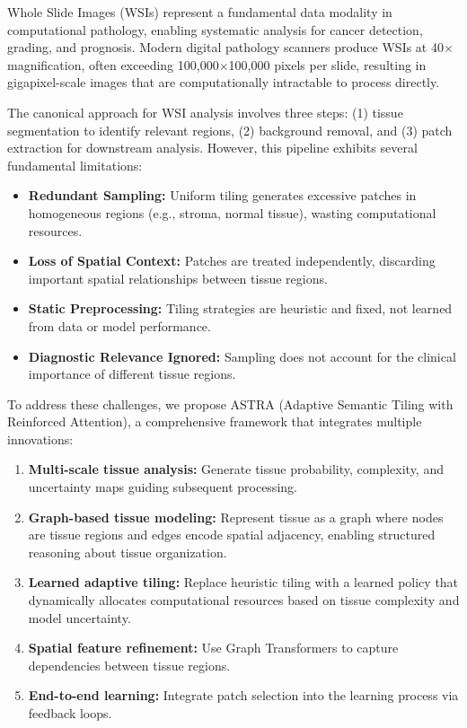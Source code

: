 \documentclass[runningheads]{llncs}
\begin{document}
\label{sec:intro}

Whole Slide Images (WSIs) represent a fundamental data modality in computational pathology, enabling systematic analysis for cancer detection, grading, and prognosis. Modern digital pathology scanners produce WSIs at 40$\times$ magnification, often exceeding 100,000$\times$100,000 pixels per slide, resulting in gigapixel-scale images that are computationally intractable to process directly.

The canonical approach for WSI analysis involves three steps: (1) tissue segmentation to identify relevant regions, (2) background removal, and (3) patch extraction for downstream analysis. However, this pipeline exhibits several fundamental limitations:

\begin{itemize}
\item \textbf{Redundant Sampling:} Uniform tiling generates excessive patches in homogeneous regions (e.g., stroma, normal tissue), wasting computational resources.

\item \textbf{Loss of Spatial Context:} Patches are treated independently, discarding important spatial relationships between tissue regions.

\item \textbf{Static Preprocessing:} Tiling strategies are heuristic and fixed, not learned from data or model performance.

\item \textbf{Diagnostic Relevance Ignored:} Sampling does not account for the clinical importance of different tissue regions.
\end{itemize}

To address these challenges, we propose ASTRA (Adaptive Semantic Tiling with Reinforced Attention), a comprehensive framework that integrates multiple innovations:

\begin{enumerate}
\item \textbf{Multi-scale tissue analysis:} Generate tissue probability, complexity, and uncertainty maps guiding subsequent processing.

\item \textbf{Graph-based tissue modeling:} Represent tissue as a graph where nodes are tissue regions and edges encode spatial adjacency, enabling structured reasoning about tissue organization.

\item \textbf{Learned adaptive tiling:} Replace heuristic tiling with a learned policy that dynamically allocates computational resources based on tissue complexity and model uncertainty.

\item \textbf{Spatial feature refinement:} Use Graph Transformers to capture dependencies between tissue regions.

\item \textbf{End-to-end learning:} Integrate patch selection into the learning process via feedback loops.
\end{enumerate}
\end{document}
